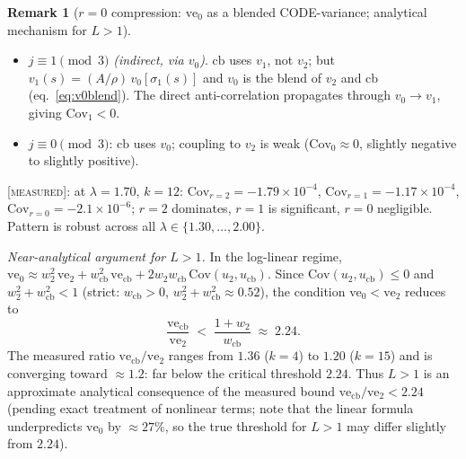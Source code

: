 \documentclass[11pt]{article}
\theoremstyle{definition}
\newtheorem{remark}[theorem]{Remark}
\newcommand{\MEASURED}{\textup{[\textsc{measured}]}}
\begin{document}
\begin{remark}[$r{=}0$ compression: $\mathrm{ve}_0$ as a blended CODE-variance;
analytical mechanism for $L>1$]
\begin{itemize}
  \emph{Multi-scale decomposition} (script~255): approximating $v_2[s]$ by its
  $\bmod 3^m$ class mean and computing the resulting proxy correlation gives cumulative
  contributions $-0.243, -0.264, -0.292, \ldots \to -0.287$ for $m=1,2,3,\ldots,6$.
  At $\lambda{=}2.00$ the level-1 term is $+0.052$ (wrong sign), but level-4 ($\bmod 81$)
  already gives $-0.222$, converging to the correct $-0.182$: the anti-correlation
  is \emph{genuinely multi-scale}, with deeper 3-adic levels dominant at large $\lambda$.
  This self-similar structure is the deepest identified source of $d_k < 1$.
\item $j\equiv 1\pmod3$ \emph{(indirect, via $v_0$)}.
  $\mathrm{cb}$ uses $v_1$, not $v_2$; but $v_1(s) = (A/\rho)\,v_0[\sigma_1(s)]$
  and $v_0$ is the blend of $v_2$ and $\mathrm{cb}$ (eq.~\ref{eq:v0blend}).
  The direct anti-correlation propagates through $v_0\to v_1$,
  giving $\mathrm{Cov}_1 < 0$.
\item $j\equiv 0\pmod3$: $\mathrm{cb}$ uses $v_0$; coupling to $v_2$ is weak
  ($\mathrm{Cov}_0 \approx 0$, slightly negative to slightly positive).
\end{itemize}
\MEASURED{}: at $\lambda{=}1.70$, $k{=}12$:
$\mathrm{Cov}_{r=2}=-1.79{\times}10^{-4}$,
$\mathrm{Cov}_{r=1}=-1.17{\times}10^{-4}$,
$\mathrm{Cov}_{r=0}=-2.1{\times}10^{-6}$;
$r{=}2$ dominates, $r{=}1$ is significant, $r{=}0$ negligible.
Pattern is robust across all $\lambda\in\{1.30,\ldots,2.00\}$.

\noindent\emph{Near-analytical argument for $L>1$.}
In the log-linear regime,
$\mathrm{ve}_0 \approx w_2^2\,\mathrm{ve}_2 + w_{\mathrm{cb}}^2\,\mathrm{ve}_{\mathrm{cb}}
+ 2w_2 w_{\mathrm{cb}}\,\mathrm{Cov}(u_2, u_{\mathrm{cb}})$.
Since $\mathrm{Cov}(u_2,u_{\mathrm{cb}}) \le 0$ and $w_2^2 + w_{\mathrm{cb}}^2 < 1$
(strict: $w_{\mathrm{cb}} > 0$, $w_2^2 + w_{\mathrm{cb}}^2 \approx 0.52$),
the condition $\mathrm{ve}_0 < \mathrm{ve}_2$ reduces to
\[
  \frac{\mathrm{ve}_{\mathrm{cb}}}{\mathrm{ve}_2} \;<\; \frac{1+w_2}{w_{\mathrm{cb}}} \;\approx\; 2.24.
\]
The measured ratio $\mathrm{ve}_{\mathrm{cb}}/\mathrm{ve}_2$ ranges from $1.36$ ($k{=}4$)
to $1.20$ ($k{=}15$) and is converging toward ${\approx}1.2$:
far below the critical threshold $2.24$.
Thus $L>1$ is an approximate analytical consequence of the measured bound
$\mathrm{ve}_{\mathrm{cb}}/\mathrm{ve}_2 < 2.24$ (pending exact treatment of nonlinear terms;
note that the linear formula underpredicts $\mathrm{ve}_0$ by $\approx 27\%$,
so the true threshold for $L{>}1$ may differ slightly from $2.24$).


\end{remark}
\end{document}
